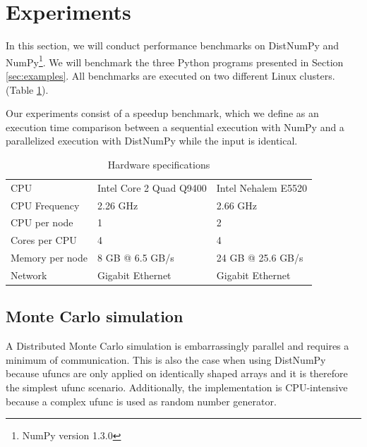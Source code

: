 \documentclass[10pt]{article}
\begin{document}
\section{Experiments}
In this section, we will conduct performance benchmarks on DistNumPy and NumPy\footnote{NumPy version 1.3.0}. We will benchmark the three Python programs presented in Section \ref{sec:examples}. All benchmarks are executed on two different Linux clusters. (Table \ref{tab:specs}).

Our experiments consist of a speedup benchmark, which we define as an execution time comparison between a sequential execution with NumPy and a parallelized execution with DistNumPy while the input is identical.



\begin{table}
\caption{Hardware specifications}
\centering
\begin{tabular}{|lll|}
\hline
CPU & Intel Core 2 Quad Q9400 & Intel Nehalem E5520\\
CPU Frequency & 2.26 GHz & 2.66 GHz\\
CPU per node & 1 & 2\\
Cores per CPU & 4 & 4\\
Memory per node & 8 GB @ 6.5 GB/s & 24 GB @ 25.6 GB/s\\
Network & Gigabit Ethernet & Gigabit Ethernet\\
\hline
\end{tabular}

\label{tab:specs}
\end{table}


\subsection{Monte Carlo simulation}
A Distributed Monte Carlo simulation is embarrassingly parallel and requires a minimum of communication.  This is also the case when using DistNumPy because ufuncs are only applied on identically shaped arrays and it is therefore the simplest ufunc scenario. Additionally, the implementation is CPU-intensive because a complex ufunc is used as random number generator. 
\end{document}

